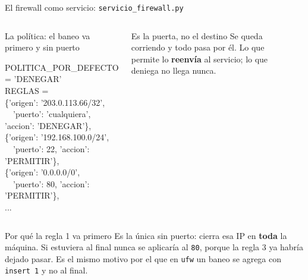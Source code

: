 \documentclass[aspectratio=169,10pt,c]{beamer}
\begin{document}
\begin{frame}{El firewall como servicio: \texttt{servicio\_firewall.py}}
\begin{columns}[T,onlytextwidth]
\begin{exampleblock}{La política: el baneo va primero y sin puerto}
\begin{terminal}\scriptsize
POLITICA\_POR\_DEFECTO = 'DENEGAR'\\
REGLAS = \lbrack\\
\quad \{'origen': '203.0.113.66/32',\\
\quad ~~'puerto': 'cualquiera', 'accion': 'DENEGAR'\},\\
\quad \{'origen': '192.168.100.0/24',\\
\quad ~~'puerto': 22, 'accion': 'PERMITIR'\},\\
\quad \{'origen': '0.0.0.0/0',\\
\quad ~~'puerto': 80, 'accion': 'PERMITIR'\},\\
\quad ...\\
\rbrack
\end{terminal}
\end{exampleblock}
\begin{block}{Es la puerta, no el destino}
\small Se queda corriendo y todo pasa por él. Lo que permite lo \textbf{reenvía} al servicio; lo que deniega no llega nunca.
\end{block}
\begin{center}
\end{center}
\end{columns}
\begin{block}{Por qué la regla 1 va primero}
\footnotesize Es la única sin puerto: cierra esa IP en \textbf{toda} la máquina. Si estuviera al final nunca se aplicaría al \texttt{80}, porque la regla 3 ya habría dejado pasar. Es el mismo motivo por el que en \texttt{ufw} un baneo se agrega con \texttt{insert 1} y no al final.
\end{block}
\end{frame}
\end{document}
